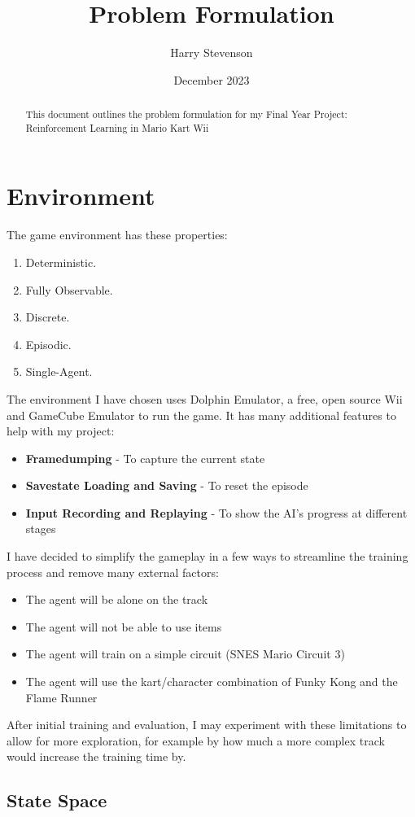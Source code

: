 \documentclass{article}
\title{Problem Formulation}
\author{Harry Stevenson}
\date{December 2023}
\begin{document}
\maketitle
\begin{abstract}
    This document outlines the problem formulation for my Final Year Project: Reinforcement Learning in Mario Kart Wii
\end{abstract}
\section{Environment}
The game environment has these properties:
\begin{enumerate}
    \item Deterministic.
    \item Fully Observable.
    \item Discrete.
    \item Episodic.
    \item Single-Agent.
\end{enumerate}
The environment I have chosen uses Dolphin Emulator, a free, open source Wii and GameCube Emulator to run the game. It has many additional features to help with my project:
\begin{itemize}
    \item \textbf{Framedumping} - To capture the current state
    \item \textbf{Savestate Loading and Saving} - To reset the episode
    \item \textbf{Input Recording and Replaying} - To show the AI's progress at different stages
\end{itemize}
I have decided to simplify the gameplay in a few ways to streamline the training process and remove many external factors:
\begin{itemize}
    \item The agent will be alone on the track
    \item The agent will not be able to use items
    \item The agent will train on a simple circuit (SNES Mario Circuit 3)
    \item The agent will use the kart/character combination of Funky Kong and the Flame Runner
\end{itemize}
After initial training and evaluation, I may experiment with these limitations to allow for more exploration, for example by how much a more complex track would increase the training time by.
\subsection{State Space}
\end{document}

